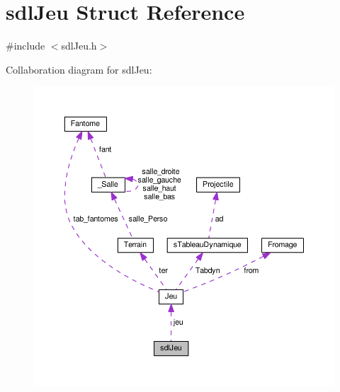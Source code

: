 \hypertarget{structsdl_jeu}{\section{sdl\-Jeu Struct Reference}
\label{structsdl_jeu}
}


{\ttfamily \#include $<$sdl\-Jeu.\-h$>$}



Collaboration diagram for sdl\-Jeu\-:\nopagebreak
\begin{figure}[H]
\begin{center}
\leavevmode
\includegraphics[width=350pt]{structsdl_jeu__coll__graph}
\end{center}
\end{figure}
